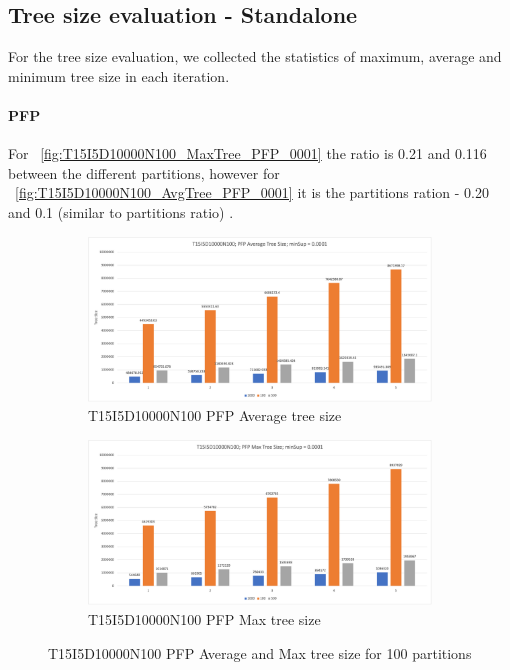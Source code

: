 \subsection{Tree size evaluation - Standalone}
For the tree size evaluation, we collected the statistics of maximum, average and minimum tree size in each iteration. 

\paragraph{PFP} For ~\autoref{fig:T15I5D10000N100_MaxTree_PFP_0001} the ratio is 0.21 and 0.116 between the different partitions, however for ~\autoref{fig:T15I5D10000N100_AvgTree_PFP_0001} it is the partitions ration - 0.20 and 0.1 (similar to partitions ratio) .

\begin{figure}[H]
  \centering
  \begin{subfigure}{\linewidth}
  \centering
  \includegraphics[width=\linewidth ,height=\textheight, keepaspectratio]{figures/4iterations/T15I5D10000N100_AvgTree_PFP_0001}
  \caption{T15I5D10000N100 PFP Average tree size}
  \label{fig:T15I5D10000N100_AvgTree_PFP_0001}
\end{subfigure}
  \begin{subfigure}{\linewidth}
  \centering
  \includegraphics[width=\linewidth ,height=\textheight, keepaspectratio]{figures/4iterations/T15I5D10000N100_MaxTree_PFP_0001}
  \caption{T15I5D10000N100 PFP Max tree size}
  \label{fig:T15I5D10000N100_MaxTree_PFP_0001}
\end{subfigure}
\caption{T15I5D10000N100 PFP Average and Max tree size for 100 partitions}
\end{figure}

